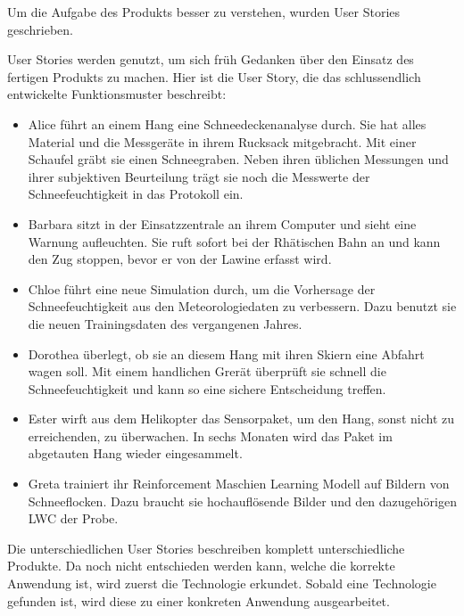 
Um die Aufgabe des Produkts besser zu verstehen, wurden User Stories geschrieben.

User Stories werden genutzt, um sich früh Gedanken über den Einsatz des fertigen Produkts zu machen. Hier ist die User Story, die das schlussendlich entwickelte Funktionsmuster beschreibt:

\begin{itemize}

\item Alice führt an einem Hang eine Schneedeckenanalyse durch. Sie hat alles Material und die Messgeräte in ihrem Rucksack mitgebracht. Mit einer Schaufel gräbt sie einen Schneegraben. Neben ihren üblichen Messungen und ihrer subjektiven Beurteilung trägt sie noch die Messwerte der Schneefeuchtigkeit in das Protokoll ein.

\item Barbara sitzt in der Einsatzzentrale an ihrem Computer und sieht eine Warnung aufleuchten. Sie ruft sofort bei der Rhätischen Bahn an und kann den Zug stoppen, bevor er von der Lawine erfasst wird.

\item Chloe führt eine neue Simulation durch, um die Vorhersage der Schneefeuchtigkeit aus den Meteorologiedaten zu verbessern. Dazu benutzt sie die neuen Trainingsdaten des vergangenen Jahres.

\item Dorothea überlegt, ob sie an diesem Hang mit ihren Skiern eine Abfahrt wagen soll. Mit einem handlichen Grerät überprüft sie schnell die Schneefeuchtigkeit und kann so eine sichere Entscheidung treffen.

\item Ester wirft aus dem Helikopter das Sensorpaket, um den Hang, sonst nicht zu erreichenden, zu überwachen. In sechs Monaten wird das Paket im abgetauten Hang wieder eingesammelt.

\item Greta trainiert ihr Reinforcement Maschien Learning Modell auf Bildern von Schneeflocken. Dazu braucht sie hochauflösende Bilder und den dazugehörigen LWC der Probe.

\end{itemize}

Die unterschiedlichen User Stories beschreiben komplett unterschiedliche Produkte. Da noch nicht entschieden werden kann, welche die korrekte Anwendung ist, wird zuerst die Technologie erkundet. Sobald eine Technologie gefunden ist, wird diese zu einer konkreten Anwendung ausgearbeitet.

